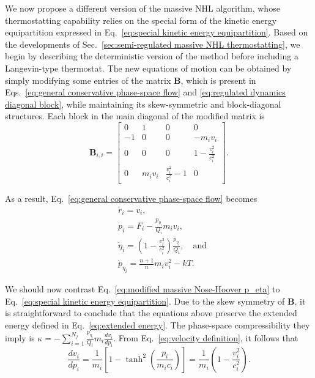 \documentclass[
aip,
jcp,
reprint,
]{revtex4-1}
\newcommand{\mt}[1]{\boldsymbol{\mathbf{#1}}}          %
\newcommand{\nn}{n}
\begin{document}
We now propose a different version of the massive NHL algorithm, whose thermostatting capability relies on the special form of the kinetic energy equipartition expressed in Eq.~\eqref{eq:special kinetic energy equipartition}.
Based on the developments of Sec.~\ref{sec:semi-regulated massive NHL thermostatting}, we begin by describing the deterministic version of the method before including a Langevin-type thermostat.
The new equations of motion can be obtained by simply modifying some entries of the matrix $\mt B$, which is present in Eqs.~\eqref{eq:general conservative phase-space flow} and \eqref{eq:regulated dynamics diagonal block}, while maintaining its skew-symmetric and block-diagonal structures.
Each block in the main diagonal of the modified matrix is
\begin{equation}
{\mt B}_{i,i} =
\left[
\begin{array}{cccc}
	0  &    1    &           0           &           0           \\
	-1 &    0    &           0           &       -m_i v_i        \\
	0  &    0    &           0           & 1-\frac{v_i^2}{c_i^2} \\
	0  & m_i v_i & \frac{v_i^2}{c_i^2}-1 &           0
\end{array}
\right].
\end{equation}

As a result, Eq.~\eqref{eq:general conservative phase-space flow} becomes
\begin{subequations}
	\label{eq:modified massive Nose-Hoover equations}
	\begin{align}
	&\dot{r}_i = v_i, \\
	&\dot{p}_i = F_i - \frac{p_{\eta_i}}{Q_i} m_i v_i,  \label{eq:modified massive Nose-Hoover p} \\
	&\dot{\eta}_i = \left(1 - \frac{v_i^2}{c_i^2}\right) \frac{p_{\eta_i}}{Q_i}, \quad \mathrm{and} \\
	&\dot{p}_{\eta_i} = \frac{\nn+1}{\nn} m_i v_i^2 - kT \label{eq:modified massive Nose-Hoover p_eta}.
	\end{align}
\end{subequations}

We should now contrast Eq.~\eqref{eq:modified massive Nose-Hoover p_eta} to Eq.~\eqref{eq:special kinetic energy equipartition}.
Due to the skew symmetry of $\mt B$, it is straightforward to conclude that the equations above preserve the extended energy defined in Eq.~\eqref{eq:extended energy}.
The phase-space compressibility they imply is $\kappa = - \sum_{i=1}^{N_f} \frac{p_{\eta_i}}{Q_i} m_i \frac{d v_i}{d p_i}$.
From Eq.~\eqref{eq:velocity definition}, it follows that
\begin{equation}
\label{eq:velocity derivative wrt momentum}
\frac{d v_i}{d p_i} = \frac{1}{m_i} \left[1 - \tanh^2\left(\frac{p_i}{m_i c_i}\right)\right] = \frac{1}{m_i} \left(1 - \frac{v_i^2}{c_i^2}\right).
\end{equation}
\end{document}
